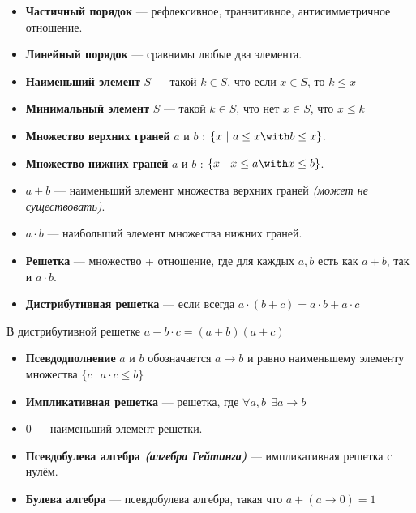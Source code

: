 \documentclass[12pt, a4paper, oneside]{book}
\begin{document}
\begin{definition}\itemfix
    \begin{itemize}
        \item \textbf{Частичный порядок} --- рефлексивное, транзитивное, антисимметричное отношение.
        \item \textbf{Линейный порядок} --- сравнимы любые два элемента.
        \item \textbf{Наименьший элемент} \(S\) --- такой \(k\in S\), что если \(x\in S\), то \(k \leq x\)
        \item \textbf{Минимальный элемент} \(S\) --- такой \(k\in S\), что нет \(x\in S\), что \(x \leq k\)
        \item \textbf{Множество верхних граней} \(a\) и \(b\) : \(\{x\ |\ a \leq x \with b \leq x\}\).
        \item \textbf{Множество нижних граней} \(a\) и \(b\) : \(\{x\ |\ x \leq a \with x \leq b\}\).
        \item \(a + b\) --- наименьший элемент множества верхних граней \textit{(может не существовать)}.
        \item \(a \cdot b\) --- наибольший элемент множества нижних граней.
        \item \textbf{Решетка} --- множество + отношение, где для каждых \(a,b\) есть как \(a + b\), так и \(a \cdot b\).
        \item \textbf{Дистрибутивная решетка} --- если всегда \(a\cdot(b + c) = a\cdot b + a\cdot c\)
    \end{itemize}
\end{definition}

\begin{lemma}
    В дистрибутивной решетке \(a + b\cdot c = (a + b)(a + c)\)
\end{lemma}

\begin{definition}\itemfix
    \begin{itemize}
        \item \textbf{Псевдодполнение} \(a\) и \(b\) обозначается \(a \to b\) и равно наименьшему элементу множества \(\{c\ |\ a\cdot c \leq b\}\)
        \item \textbf{Импликативная решетка} --- решетка, где \(\forall a, b \ \ \exists a \to b\)
        \item \(0\) --- наименьший элемент решетки.
        \item \textbf{Псевдобулева алгебра \textit{(алгебра Гейтинга)}} --- импликативная решетка с нулём.
        \item \textbf{Булева алгебра} --- псевдобулева алгебра, такая что \(a + (a \to 0) = 1\)
    \end{itemize}
\end{definition}
\end{document}
